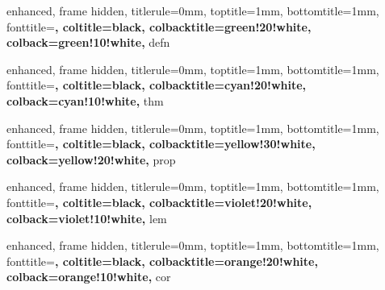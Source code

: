 
{
    enhanced,
    frame hidden,
    titlerule=0mm,
    toptitle=1mm,
    bottomtitle=1mm,
    fonttitle=\bfseries\large,
    coltitle=black,
    colbacktitle=green!20!white,
    colback=green!10!white,
}{defn}


{
    enhanced,
    frame hidden,
    titlerule=0mm,
    toptitle=1mm,
    bottomtitle=1mm,
    fonttitle=\bfseries\large,
    coltitle=black,
    colbacktitle=cyan!20!white,
    colback=cyan!10!white,
}{thm}


{
    enhanced,
    frame hidden,
    titlerule=0mm,
    toptitle=1mm,
    bottomtitle=1mm,
    fonttitle=\bfseries\large,
    coltitle=black,
    colbacktitle=yellow!30!white,
    colback=yellow!20!white,
}{prop}


{
    enhanced,
    frame hidden,
    titlerule=0mm,
    toptitle=1mm,
    bottomtitle=1mm,
    fonttitle=\bfseries\large,
    coltitle=black,
    colbacktitle=violet!20!white,
    colback=violet!10!white,
}{lem}


{
    enhanced,
    frame hidden,
    titlerule=0mm,
    toptitle=1mm,
    bottomtitle=1mm,
    fonttitle=\bfseries\large,
    coltitle=black,
    colbacktitle=orange!20!white,
    colback=orange!10!white,
}{cor}


